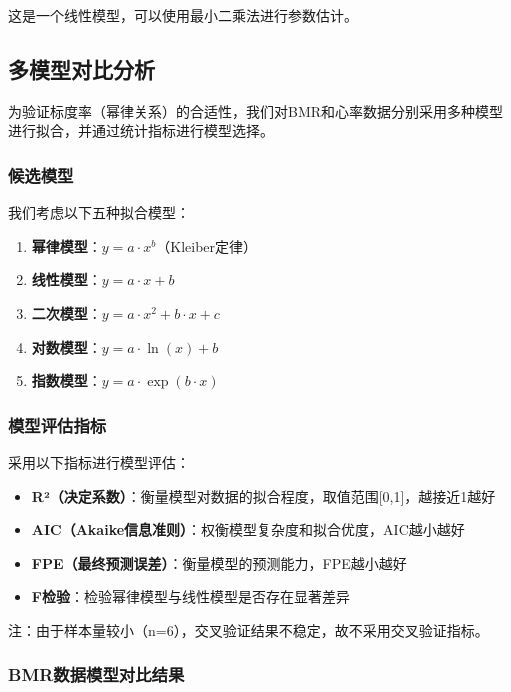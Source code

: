 这是一个线性模型，可以使用最小二乘法进行参数估计。

\subsection{多模型对比分析}

为验证标度率（幂律关系）的合适性，我们对BMR和心率数据分别采用多种模型进行拟合，并通过统计指标进行模型选择。

\subsubsection{候选模型}

我们考虑以下五种拟合模型：

\begin{enumerate}
    \item \textbf{幂律模型}：$y = a \cdot x^b$（Kleiber定律）
    \item \textbf{线性模型}：$y = a \cdot x + b$
    \item \textbf{二次模型}：$y = a \cdot x^2 + b \cdot x + c$
    \item \textbf{对数模型}：$y = a \cdot \ln(x) + b$
    \item \textbf{指数模型}：$y = a \cdot \exp(b \cdot x)$
\end{enumerate}

\subsubsection{模型评估指标}

采用以下指标进行模型评估：

\begin{itemize}
    \item \textbf{R²（决定系数）}：衡量模型对数据的拟合程度，取值范围[0,1]，越接近1越好
    \item \textbf{AIC（Akaike信息准则）}：权衡模型复杂度和拟合优度，AIC越小越好
    \item \textbf{FPE（最终预测误差）}：衡量模型的预测能力，FPE越小越好
    \item \textbf{F检验}：检验幂律模型与线性模型是否存在显著差异
\end{itemize}

注：由于样本量较小（n=6），交叉验证结果不稳定，故不采用交叉验证指标。

\subsubsection{BMR数据模型对比结果}

